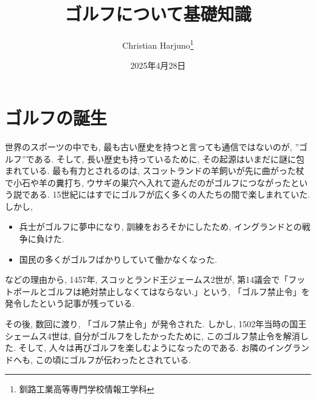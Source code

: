 \documentclass[a4j, twocolumn]{jarticle}
\begin{document}
\title{ゴルフについて基礎知識}
\author{Christian Harjuno\thanks{釧路工業高等専門学校情報工学科}}
\date{2025年4月28日}
\maketitle

\section{ゴルフの誕生}
世界のスポーツの中でも, 最も古い歴史を持つと言っても通信ではないのが, ”ゴルフ”である. そして, 長い歴史も持っているために, その起源はいまだに謎に包まれている. 最も有力とされるのは, スコットランドの羊飼いが先に曲がった杖で小石や羊の糞打ち, ウサギの巣穴へ入れて遊んだのがゴルフにつながったという説である. 15世紀にはすでにゴルフが広く多くの人たちの間で楽しまれていた. しかし, 

\begin{itemize}
  \item 兵士がゴルフに夢中になり, 訓練をおろそかにしたため, イングランドとの戦争に負けた.
  \item 国民の多くがゴルフばかりしていて働かなくなった.
\end{itemize}
などの理由から, 1457年, スコッとランド王ジェームス2世が, 第14議会で「フットボールとゴルフは絶対禁止しなくてはならない.」という, 「ゴルフ禁止令」を発令したという記事が残っている\cite{JINSEI}.

その後, 数回に渡り, 「ゴルフ禁止令」が発令された. しかし, 1502年当時の国王シェームス4世は, 自分がゴルフをしたかったために, このゴルフ禁止令を解消した. そして, 人々は再びゴルフを楽しむようになったのである. お隣のイングランドへも, この頃にゴルフが伝わったとされている. 
\end{document}
